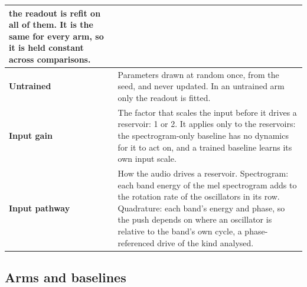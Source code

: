 \documentclass{article}
\begin{document}
{\begin{longtable}[]{@{}
  >{\raggedright\arraybackslash}p{}
  >{\raggedright\arraybackslash}p{}@{}}
the readout is refit on all of them. It is the same for every arm, so it
is held constant across comparisons. \\
\cmidrule{1-2}\textbf{Untrained} & Parameters drawn at random once, from
the seed, and never updated. In an untrained arm only the readout is
fitted. \\
\cmidrule{1-2}\textbf{Input gain} & The factor that scales the input
before it drives a reservoir: 1 or 2. It applies only to the reservoirs:
the spectrogram-only baseline has no dynamics for it to act on, and a
trained baseline learns its own input scale. \\
\cmidrule{1-2}\textbf{Input pathway} & How the audio drives a reservoir.
Spectrogram: each band energy of the mel spectrogram adds to the
rotation rate of the oscillators in its row. Quadrature: each band's
energy and phase, so the push depends on where an oscillator is relative
to the band's own cycle, a phase-referenced drive of the kind
\citet{adler1946} analysed. \\
\end{longtable}
}

\subsection{Arms and baselines}\label{sec-A-2}
\end{document}

